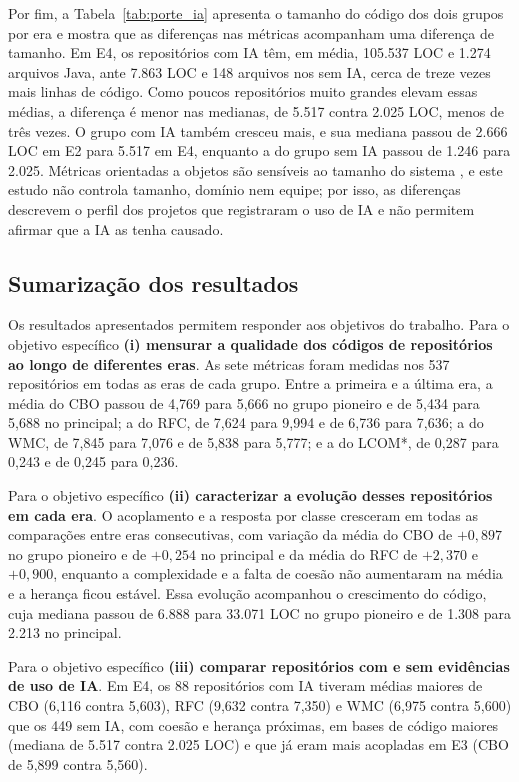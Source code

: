Por fim, a Tabela~\ref{tab:porte_ia} apresenta o tamanho do código dos dois grupos por era e mostra que as diferenças nas métricas acompanham uma diferença de tamanho. Em E4, os repositórios com IA têm, em média, 105.537 LOC e 1.274 arquivos Java, ante 7.863 LOC e 148 arquivos nos sem IA, cerca de treze vezes mais linhas de código. Como poucos repositórios muito grandes elevam essas médias, a diferença é menor nas medianas, de 5.517 contra 2.025 LOC, menos de três vezes. O grupo com IA também cresceu mais, e sua mediana passou de 2.666 LOC em E2 para 5.517 em E4, enquanto a do grupo sem IA passou de 1.246 para 2.025. Métricas orientadas a objetos são sensíveis ao tamanho do sistema \cite{elemam:01}, e este estudo não controla tamanho, domínio nem equipe; por isso, as diferenças descrevem o perfil dos projetos que registraram o uso de IA e não permitem afirmar que a IA as tenha causado.



\subsection{Sumarização dos resultados}
\label{subsec:sumarizacao}

Os resultados apresentados permitem responder aos objetivos do trabalho. Para o objetivo específico \textbf{(i) mensurar a qualidade dos códigos de repositórios ao longo de diferentes eras}. As sete métricas foram medidas nos 537 repositórios em todas as eras de cada grupo. Entre a primeira e a última era, a média do CBO passou de 4,769 para 5,666 no grupo pioneiro e de 5,434 para 5,688 no principal; a do RFC, de 7,624 para 9,994 e de 6,736 para 7,636; a do WMC, de 7,845 para 7,076 e de 5,838 para 5,777; e a do LCOM*, de 0,287 para 0,243 e de 0,245 para 0,236.

Para o objetivo específico \textbf{(ii) caracterizar a evolução desses repositórios em cada era}. O acoplamento e a resposta por classe cresceram em todas as comparações entre eras consecutivas, com variação da média do CBO de $+0{,}897$ no grupo pioneiro e de $+0{,}254$ no principal e da média do RFC de $+2{,}370$ e $+0{,}900$, enquanto a complexidade e a falta de coesão não aumentaram na média e a herança ficou estável. Essa evolução acompanhou o crescimento do código, cuja mediana passou de 6.888 para 33.071 LOC no grupo pioneiro e de 1.308 para 2.213 no principal.

Para o objetivo específico \textbf{(iii) comparar repositórios com e sem evidências de uso de IA}. Em E4, os 88 repositórios com IA tiveram médias maiores de CBO (6,116 contra 5,603), RFC (9,632 contra 7,350) e WMC (6,975 contra 5,600) que os 449 sem IA, com coesão e herança próximas, em bases de código maiores (mediana de 5.517 contra 2.025 LOC) e que já eram mais acopladas em E3 (CBO de 5,899 contra 5,560).

